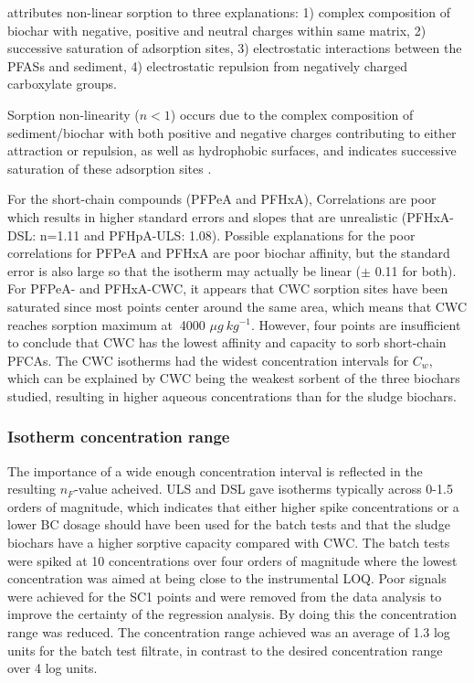 \citep{yin2022insights} attributes non-linear sorption to three explanations: 1) complex composition of biochar with negative, positive and neutral charges within same matrix, 2) successive saturation of adsorption sites, 3) electrostatic interactions between the PFASs and sediment, 4) electrostatic repulsion from negatively charged carboxylate groups. 

Sorption non-linearity ($n<1$) occurs due to the complex composition of sediment/biochar with both positive and negative charges contributing to either attraction or repulsion, as well as hydrophobic surfaces, and indicates successive saturation of these adsorption sites \citep{yin2022insights}.  

For the short-chain compounds (PFPeA and PFHxA), Correlations are poor which results in higher standard errors and slopes that are unrealistic (PFHxA-DSL: n=1.11 and PFHpA-ULS: 1.08). Possible explanations for the poor correlations for PFPeA and PFHxA are poor biochar affinity, but the standard error is also large so that the isotherm may actually be linear ($\pm$ 0.11 for both). For PFPeA- and PFHxA-CWC, it appears that CWC sorption sites have been saturated since most points center around the same area, which means that CWC reaches sorption maximum at $~$4000 $\mu g~kg^{-1}$. However, four points are insufficient to conclude that CWC has the lowest affinity and capacity to sorb short-chain PFCAs. The CWC isotherms had the widest concentration intervals for $C_w$, which can be explained by CWC being the weakest sorbent of the three biochars studied, resulting in higher aqueous concentrations than for the sludge biochars. 

\subsubsection{Isotherm concentration range}
The importance of a wide enough concentration interval is reflected in the resulting $n_F$-value acheived. ULS and DSL gave isotherms typically across 0-1.5 orders of magnitude, which indicates that either higher spike concentrations or a lower BC dosage should have been used for the batch tests and that the sludge biochars have a higher sorptive capacity compared with CWC. The batch tests were spiked at 10 concentrations over four orders of magnitude where the lowest concentration was aimed at being close to the instrumental LOQ. Poor signals were achieved for the SC1 points and were removed from the data analysis to improve the certainty of the regression analysis. By doing this the concentration range was reduced. The concentration range achieved was an average of 1.3 log units for the batch test filtrate, in contrast to the desired concentration range over 4 log units.

